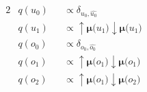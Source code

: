 \documentclass[fleqn]{article}
\begin{document}
\begin{minipage}[t]{0.5\textwidth}
\begin{alignat}{2}
         & q(u_0)                                                           &  & \propto \delta_{u_0,\hat{u_0}}                                                                                                                                                 \\
         & q(u_1)                                                           &  & \propto \bm{{\uparrow}{\mu}(}u_1\bm{)} \bm{{\downarrow}{\mu}(}u_1\bm{)}                                                                                                        \\
         & q(o_0)                                                           &  & \propto \delta_{o_0,\hat{o_0}}                                                                                                                                                 \\
         & q(o_1)                                                           &  & \propto \bm{{\uparrow}{\mu}(}o_1\bm{)} \bm{{\downarrow}{\mu}(}o_1\bm{)}                                                                                                        \\
         & q(o_2)                                                           &  & \propto \bm{{\uparrow}{\mu}(}o_1\bm{)} \bm{{\downarrow}{\mu}(}o_2\bm{)}
    \end{alignat}
\end{minipage}
\end{document}
